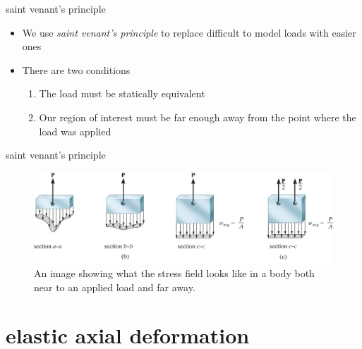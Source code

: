 \documentclass[
  letterpaper,
  ignorenonframetext,
  aspectratio=43,
  handout,
  12pt]{beamer}
\providecommand{\tightlist}{%
  \setlength{\itemsep}{0pt}\setlength{\parskip}{0pt}}
\providecommand{\tightlist}{%
\setlength{\itemsep}{0pt}\setlength{\parskip}{0pt}}
\let\Oldincludegraphics\includegraphics
\renewcommand{\includegraphics}[2][]{\Oldincludegraphics[width=\textwidth,height=0.7\textheight,keepaspectratio]{#2}}
\begin{document}
\begin{frame}{saint venant's principle}
\protect\hypertarget{saint-venants-principle-2}{}
\begin{itemize}
\tightlist
\item
  We use \emph{saint venant's principle} to replace difficult to model
  loads with easier ones
\item
  There are two conditions

  \begin{enumerate}
  \tightlist
  \item
    The load must be statically equivalent
  \item
    Our region of interest must be far enough away from the point where
    the load was applied
  \end{enumerate}
\end{itemize}
\end{frame}

\begin{frame}{saint venant's principle}
\protect\hypertarget{saint-venants-principle-3}{}
\begin{figure}
\centering
\includegraphics{../images/st-venant.jpg}
\caption{An image showing what the stress field looks like in a body
both near to an applied load and far away.}
\end{figure}
\end{frame}

\hypertarget{elastic-axial-deformation}{%
\section{elastic axial deformation}\label{elastic-axial-deformation}}
\end{document}
